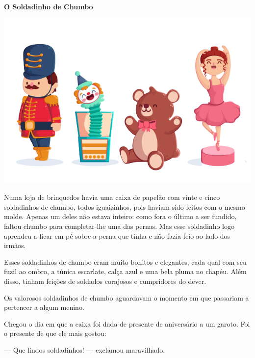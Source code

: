 \begin{conteudo}
\begin{conteudo}
\begin{conteudo}
\begin{conteudo}
\begin{conteudo}

\begin{myquote}
\textbf{O Soldadinho de Chumbo}


\begin{center}
\includegraphics[width=\textwidth]{media/image24a.png}
\end{center}


Numa loja de brinquedos havia uma caixa de papelão com vinte e cinco
soldadinhos de chumbo, todos iguaizinhos, pois haviam sido feitos com o
mesmo molde. Apenas um deles não estava inteiro: como fora o último a ser
fundido, faltou chumbo para completar-lhe uma das pernas. Mas esse soldadinho
logo aprendeu a ficar em pé sobre a perna que tinha e não fazia feio
ao lado dos irmãos.

Esses soldadinhos de chumbo eram muito bonitos e elegantes, cada qual
com seu fuzil ao ombro, a túnica escarlate, calça azul e uma bela pluma
no chapéu. Além disso, tinham feições de soldados corajosos e
cumpridores do dever.

Os valorosos soldadinhos de chumbo aguardavam o momento em que passariam
a pertencer a algum menino.

Chegou o dia em que a caixa foi dada de presente de aniversário a um
garoto. Foi o presente de que ele mais gostou:

--- Que lindos soldadinhos! --- exclamou maravilhado.


\end{myquote}
\end{conteudo}
\end{conteudo}
\end{conteudo}
\end{conteudo}
\end{conteudo}
